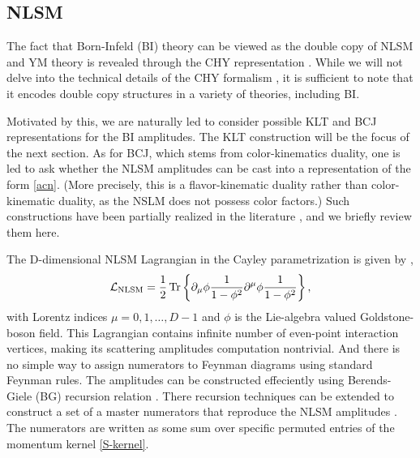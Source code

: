 \documentclass[a4paper,11pt]{article}
\begin{document}
\subsection{NLSM}
The fact that Born-Infeld (BI) theory can be viewed as the double copy of NLSM and YM theory is revealed through the CHY representation \cite{Cachazo:2014xea,Cachazo:2015ksa}. 
While we will not delve into the technical details of the CHY formalism \cite{Cachazo:2013hca,Cachazo:2013iea}, it is sufficient to note that it encodes double copy structures in a variety of theories, including BI.\par
Motivated by this, we are naturally led to consider possible KLT and BCJ representations for the BI amplitudes. 
The KLT construction will be the focus of the next section. As for BCJ, which stems from color-kinematics duality, 
one is led to ask whether the NLSM amplitudes can be cast into a representation of the form \eqref{acn}. (More precisely, this is a flavor-kinematic duality rather than color-kinematic duality, as the NSLM does not possess color factors.)  
Such constructions have been partially realized in the literature \cite{Du:2016tbc,Carrasco:2016ldy,Carrasco:2016ygv}, and we briefly review them here.\par
The D-dimensional NLSM Lagrangian in the Cayley parametrization is given by \cite{Carrasco:2016ldy},
\begin{equation}
    \mathcal{L}_{\text{NLSM}}=\frac{1}{2}\Tr\left\{\partial_\mu\phi\frac{1}{1-\phi^2}\partial^{\mu}\phi\frac{1}{1-\phi^2}\right\},
\end{equation}
with Lorentz indices $\mu=0,1,\dots, D-1$ and $\phi$ is the Lie-algebra valued Goldstone-boson field.  
This Lagrangian contains infinite number of even-point interaction vertices, making its scattering amplitudes computation nontrivial. And there is no simple way to assign 
numerators to Feynman diagrams using standard Feynman rules. 
The amplitudes can be constructed effeciently using Berends-Giele (BG) \cite{Berends:1987me} recursion relation \cite{Kampf:2012fn}. 
There recursion techniques can be extended to construct a set of a master numerators that reproduce the NLSM amplitudes \cite{Du:2016tbc}. 
The numerators are written as some sum over specific permuted entries of the momentum kernel \eqref{S-kernel}.
\end{document}
